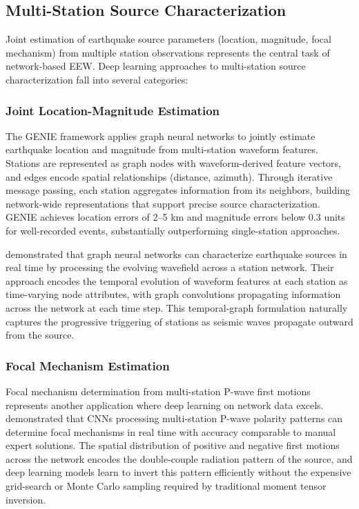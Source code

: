 \documentclass[review,authoryear]{elsarticle}
\begin{document}
\subsection{Multi-Station Source Characterization}

Joint estimation of earthquake source parameters (location, magnitude, focal mechanism) from multiple station observations represents the central task of network-based EEW. Deep learning approaches to multi-station source characterization fall into several categories:

\subsubsection{Joint Location-Magnitude Estimation}

The GENIE framework \citep{mcbrearty2023earthquake} applies graph neural networks to jointly estimate earthquake location and magnitude from multi-station waveform features. Stations are represented as graph nodes with waveform-derived feature vectors, and edges encode spatial relationships (distance, azimuth). Through iterative message passing, each station aggregates information from its neighbors, building network-wide representations that support precise source characterization. GENIE achieves location errors of 2--5 km and magnitude errors below 0.3 units for well-recorded events, substantially outperforming single-station approaches.

\citet{vandenende2020deep} demonstrated that graph neural networks can characterize earthquake sources in real time by processing the evolving wavefield across a station network. Their approach encodes the temporal evolution of waveform features at each station as time-varying node attributes, with graph convolutions propagating information across the network at each time step. This temporal-graph formulation naturally captures the progressive triggering of stations as seismic waves propagate outward from the source.

\subsubsection{Focal Mechanism Estimation}

Focal mechanism determination from multi-station P-wave first motions represents another application where deep learning on network data excels. \citet{kuang2021real} demonstrated that CNNs processing multi-station P-wave polarity patterns can determine focal mechanisms in real time with accuracy comparable to manual expert solutions. The spatial distribution of positive and negative first motions across the network encodes the double-couple radiation pattern of the source, and deep learning models learn to invert this pattern efficiently without the expensive grid-search or Monte Carlo sampling required by traditional moment tensor inversion.
\end{document}
